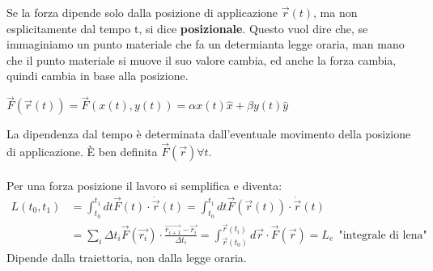 Se la forza dipende solo dalla posizione di applicazione $\vec{r}(t)$, ma non esplicitamente dal tempo t, si dice \textbf{posizionale}. Questo vuol
dire che, se immaginiamo un punto materiale che fa un determianta legge oraria, man mano che il punto materiale si muove il suo valore cambia, ed anche la forza 
cambia, quindi cambia in base alla posizione.
\begin{example}
    $\vec{F}(\vec{r}(t)) = \vec{F}(x(t), y(t)) = \alpha x(t) \hat{x} + \beta y(t) \hat{y}$
\end{example}
\hspace{-15pt}La dipendenza dal tempo è determinata dall'eventuale movimento della posizione di applicazione. È ben definita $\vec{F}(\vec{r}) \forall t$. \\\\
Per una forza posizione il lavoro si semplifica e diventa:
\begin{equation*}
    \begin{split}
        L(t_0, t_1) & = \int_{t_0}^{t_1}dt \vec{F}(t) \cdot \dot{\vec{r}}(t) = \int_{t_0}^{t_1}dt \vec{F}(\vec{r}(t)) \cdot \dot{\vec{r}}(t) \\
                    & = \sum_i \Delta t_i \vec{F}(\vec{r_i}) \cdot \frac{\vec{r_{i+1}} - \vec{r_i}}{\Delta t_i} = \int_{\vec{r}(t_0 )}^{\vec{r}(t_i)} d\vec{r}\cdot \vec{F}(\vec{r}) = L_e \:\:\text{"integrale di lena"}
    \end{split}
\end{equation*}
Dipende dalla traiettoria, non dalla legge oraria.
